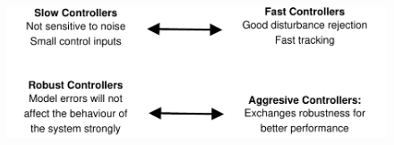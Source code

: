 \begin{frame}
	\begin{figure}
		\centering
		\includegraphics[width=1.1\linewidth]{comparison}
		\caption{}
		\label{fig:comparison}
	\end{figure}
\end{frame}